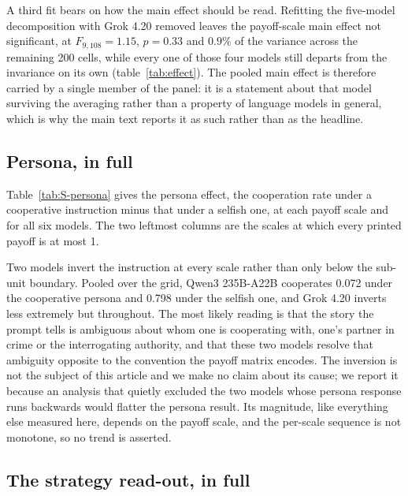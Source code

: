 \documentclass[openacc]{rsproca_new}
\begin{document}
A third fit bears on how the main effect should be read. Refitting the
five-model decomposition with Grok 4.20 removed leaves the payoff-scale main
effect not significant, at $F_{9,108} = 1.15$, $p = 0.33$ and $0.9\%$ of the
variance across the remaining 200 cells, while every one of those four models
still departs from the invariance on its own (table~\ref{tab:effect}). The
pooled main effect is
therefore carried by a single member of the panel: it is a statement about that
model surviving the averaging rather than a property of language models in
general, which is why the main text reports it as such rather than as the
headline.

\subsection{Persona, in full}\label{appendix:persona_full}

Table~\ref{tab:S-persona} gives the persona effect, the cooperation rate under
a cooperative instruction minus that under a selfish one, at each payoff scale
and for all six models. The two leftmost columns are the scales at which every
printed payoff is at most 1.

Two models invert the instruction at every scale rather than only below the
sub-unit boundary. Pooled over the grid, Qwen3 235B-A22B cooperates 0.072 under
the cooperative persona and 0.798 under the selfish one, and Grok 4.20 inverts
less extremely but throughout. The most likely reading is that the story the
prompt tells is ambiguous about whom one is cooperating with, one's partner in
crime or the interrogating authority, and that these two models resolve that
ambiguity opposite to the convention the payoff matrix encodes. The inversion
is not the subject of this article and we make no claim about its cause; we
report it because an analysis that quietly excluded the two models whose
persona response runs backwards would flatter the persona result. Its
magnitude, like everything else measured here, depends on the payoff scale, and
the per-scale sequence is not monotone, so no trend is asserted.

\subsection{The strategy read-out, in full}\label{appendix:readout_full}
\end{document}
